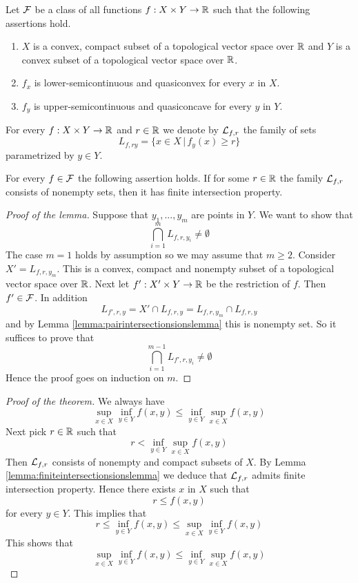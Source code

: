 \noindent
Let ${\mathcal F}$ be a class of all functions $f:X\times Y\rightarrow {\mathbb R}$ such that the following assertions hold.
\begin{enumerate}[label=\textbf{(\arabic*)}, leftmargin=1.5em]
\item $X$ is a convex, compact subset of a topological vector space over ${\mathbb R}$ and $Y$ is a convex subset of a topological vector space over ${\mathbb R}$.
\item $f_x$ is lower-semicontinuous and quasiconvex for every $x$ in $X$.
\item $f_y$ is upper-semicontinuous and quasiconcave for every $y$ in $Y$.
\end{enumerate}
For every $f:X\times Y\rightarrow {\mathbb R}$ and $r\in {\mathbb R}$ we denote by ${\mathcal L}_{f,r}$ the family of sets
$$L_{f,ry} = \big\{x\in X\,\big|\,f_y(x)\geq r \big\}$$
parametrized by $y\in Y$.

\begin{lemma}\label{lemma:finiteintersectionsionslemma}
For every $f\in {\mathcal F}$ the following assertion holds. If for some $r\in {\mathbb R}$ the family ${\mathcal L}_{f,r}$ consists of nonempty sets, then it has finite intersection property.
\end{lemma}
\begin{proof}[Proof of the lemma]
Suppose that $y_1,...,y_{m}$ are points in $Y$. We want to show that
$$\bigcap_{i=1}^{m}L_{f,r,y_i} \neq \emptyset$$
The case $m=1$ holds by assumption so we may assume that $m\geq 2$. Consider $X' = L_{f,r,y_{m}}$. This is a convex, compact and nonempty subset of a topological vector space over ${\mathbb R}$. Next let $f':X'\times Y\rightarrow {\mathbb R}$ be the restriction of $f$. Then $f'\in {\mathcal F}$. In addition
$$L_{f',r,y} = X' \cap L_{f,r,y} = L_{f,r,y_{m}} \cap L_{f,r,y}$$
and by Lemma \ref{lemma:pairintersectionsionslemma} this is nonempty set. So it suffices to prove that
$$\bigcap_{i=1}^{m-1} L_{f',r,y_i} \neq \emptyset$$
Hence the proof goes on induction on $m$. 
\end{proof}

\begin{proof}[Proof of the theorem]
We always have
$$\sup_{x\in X}\inf_{y\in Y}f(x,y) \leq \inf_{y\in Y}\sup_{x\in X}f(x,y)$$
Next pick $r\in {\mathbb R}$ such that
$$r < \inf_{y\in Y}\sup_{x\in X}f(x,y)$$
Then ${\mathcal L}_{f,r}$ consists of nonempty and compact subsets of $X$. By Lemma \ref{lemma:finiteintersectionsionslemma} we deduce that ${\mathcal L}_{f,r}$ admits finite intersection property. Hence there exists $x$ in $X$ such that
$$r \leq f(x,y)$$
for every $y\in Y$. This implies that
$$r\leq \inf_{y\in Y}f(x,y) \leq \sup_{x\in X}\inf_{y\in Y}f(x,y)$$
This shows that
$$\sup_{x\in X}\inf_{y\in Y}f(x,y) \leq \inf_{y\in Y}\sup_{x\in X}f(x,y)$$
\end{proof}

